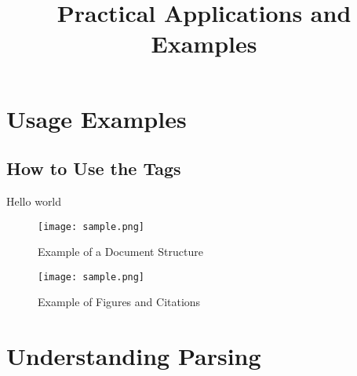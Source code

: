 \documentclass[oneside]{book}
\begin{document}
\newpage
\chapter{Usage Examples}
\section{How to Use the Tags}
\title{Practical Applications and Examples}
Hello world\par
\begin{figure}[h]
\centering
\texttt{[image: sample.png]}
\caption{Example of a Document Structure}
\texttt{[image: sample.png]}
\caption{Example of Figures and Citations}
\end{figure}
\newpage
\chapter{Understanding Parsing}
\end{document}
